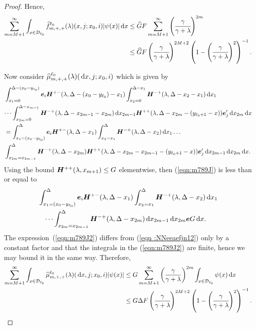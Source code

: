 \begin{proof}
	Hence,  
	\begin{align}
		\sum_{m=M+1}^\infty \int_{x\in\mathcal{D}_{\ell_0}} \widehat f^{\ell_0}_{m,+,+}(\lambda)(x,j;x_0,i)|\psi(x)|\, \mathrm{d} x \nonumber
		&\leq \widehat GF  \sum_{m=M+1}^\infty \left(\cfrac{\gamma}{\gamma+\lambda}\right)^{2m}\nonumber
		\\&\leq \widehat GF \left(\cfrac{\gamma}{\gamma+\lambda}\right)^{2M+2} \left(1-\left(\cfrac{\gamma}{\gamma+\lambda}\right)^2\right)^{-1}.
	\end{align}
	
	Now consider \(\widehat\mu_{m,+,+}^{\ell_0}(\lambda)( \, \mathrm{d} x,j;x_0,i) \) which is given by 
	\begin{align}
	\nonumber& \int_{x_1 = 0}^{\Delta-(x_0-y_{\ell_0})} \boldsymbol e_i\boldsymbol H^{+-}(\lambda,\Delta-(x_0-y_{\ell_0})-x_1) \int_{x_2 = 0}^{\Delta-x_1} \boldsymbol H^{-+}(\lambda,\Delta - x_2-x_1) \, \mathrm{d} x_1 
	\\\nonumber &\dots  
	\int_{x_{2m}=0}^{\Delta-x_{m-1}} \boldsymbol H^{-+}(\lambda,\Delta -x_{2m-1} - x_{2m}) \, \mathrm{d} x_{2m-1}
		\boldsymbol H^{++}(\lambda,\Delta -x_{2m}- (y_{\ell_0+1}- x))\boldsymbol e_j'{}\, \mathrm{d} x_{2m}\, \mathrm{d} x
	\\\nonumber&= \int_{x_1 = (x_0-y_{\ell_0})}^{\Delta} \boldsymbol e_i \boldsymbol H^{+-}(\lambda,\Delta-x_1) \int_{x_2 = x_1}^{\Delta} \boldsymbol H^{-+}(\lambda,\Delta -x_2) \, \mathrm{d} x_1 
	\dots  
	\\&\int_{x_{2m}=x_{2m-1}}^{\Delta} \boldsymbol H^{-+}(\lambda,\Delta - x_{2m}) 
	\boldsymbol H^{++}(\lambda,\Delta -x_{2m}-x_{2m-1}- (y_{\ell_0+1}- x))\boldsymbol e_j'{} 
	\, \mathrm{d} x_{2m-1}\, \mathrm{d} x_{2m}\, \mathrm{d} x.\label{eqn:m789J}
	\end{align}
	Using the bound \(\boldsymbol H^{++}(\lambda,x_{m+1})\leq G\) elementwise, then (\ref{eqn:m789J}) is less than or equal to 
	\begin{align}
		&\int_{x_1 = (x_0-y_{\ell_0})}^{\Delta} \boldsymbol e_i\boldsymbol H^{+-}(\lambda,\Delta-x_1) \int_{x_2 = x_1}^{\Delta} \boldsymbol H^{-+}(\lambda,\Delta -x_2) \, \mathrm{d} x_1 \nonumber
		\\&\quad\dots  
		\int_{x_{2m}=x_{2m-1}}^{\Delta} \boldsymbol H^{-+}(\lambda,\Delta - x_{2m})  
		\, \mathrm{d} x_{2m-1}\, \mathrm{d} x_{2m}\boldsymbol e G\, \mathrm{d} x.\label{eqn:m789J2}
	\end{align}
	The expression~(\ref{eqn:m789J2}) differs from (\ref{eqn :NNeeaefjn12}) only by a constant factor and that the integrals in the (\ref{eqn:m789J2}) are finite, hence we may bound it in the same way. Therefore, 
	\begin{align}
		\sum_{m=M+1}^\infty \int_{x\in\mathcal{D}_{\ell_0}} \widehat \mu^{\ell_0}_{m,+,+}(\lambda)(\, \mathrm{d} x,j;x_0,i) |\psi(x)| \nonumber
		&\leq G \sum_{m=M+1}^\infty\left(\frac{\gamma}{\gamma+\lambda}\right)^{2m}\int_{x\in\mathcal{D}_{\ell_0}}\psi(x)\, \mathrm{d} x
		\\&\leq G\Delta F\left(\cfrac{\gamma}{\gamma+\lambda}\right)^{2M+2} \left(1-\left(\cfrac{\gamma}{\gamma+\lambda}\right)^2\right)^{-1}.
	\end{align}
        

\end{proof}
